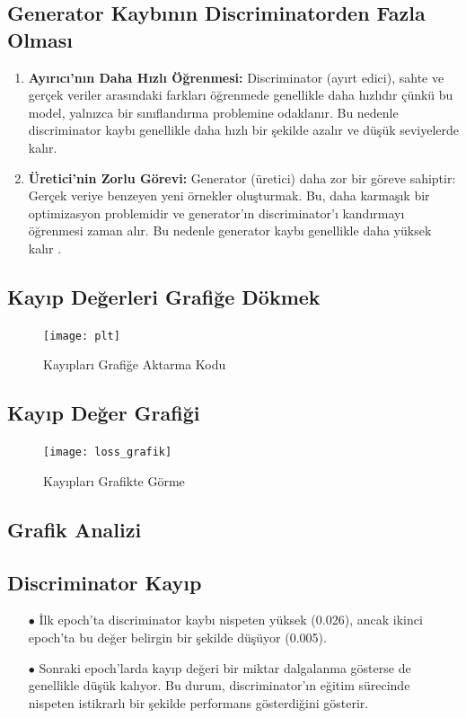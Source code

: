 \documentclass[10pt]{article}
\begin{document}
	\subsection{Generator Kaybının Discriminatorden Fazla Olması}
	\begin{enumerate}
		\item \textbf{Ayırıcı'nın Daha Hızlı Öğrenmesi:} Discriminator (ayırt edici), sahte ve gerçek veriler arasındaki farkları öğrenmede genellikle daha hızlıdır çünkü bu model, yalnızca bir sınıflandırma problemine odaklanır. Bu nedenle discriminator kaybı genellikle daha hızlı bir şekilde azalır ve düşük seviyelerde kalır.
		\item \textbf{Üretici'nin Zorlu Görevi:} Generator (üretici) daha zor bir göreve sahiptir: Gerçek veriye benzeyen yeni örnekler oluşturmak. Bu, daha karmaşık bir optimizasyon problemidir ve generator'ın discriminator'ı kandırmayı öğrenmesi zaman alır. Bu nedenle generator kaybı genellikle daha yüksek kalır \cite{loss_stackovervlof}.
	\end{enumerate}
	
	\subsection{Kayıp Değerleri Grafiğe Dökmek}
	\begin{figure}[htbp]
		\centering
		\texttt{[image: plt]}
		\caption{Kayıpları Grafiğe Aktarma Kodu}
		\label{fig:plt}
	\end{figure}
	
	\subsection{Kayıp Değer Grafiği}
	\begin{figure}[htbp]
		\centering
		\texttt{[image: loss\_grafik]}
		\caption{Kayıpları Grafikte Görme}
		\label{fig:plt}
	\end{figure}
	
	\subsection{Grafik Analizi}
	\subsection{Discriminator Kayıp}
	\begin{itemize}
		\item[$\bullet$] İlk epoch'ta discriminator kaybı nispeten yüksek (0.026), ancak ikinci epoch'ta bu değer belirgin bir şekilde düşüyor (0.005).
		\item[$\bullet$] Sonraki epoch'larda kayıp değeri bir miktar dalgalanma gösterse de genellikle düşük kalıyor. Bu durum, discriminator'ın eğitim sürecinde nispeten istikrarlı bir şekilde performans gösterdiğini gösterir.
	\end{itemize}
	
\end{document}
